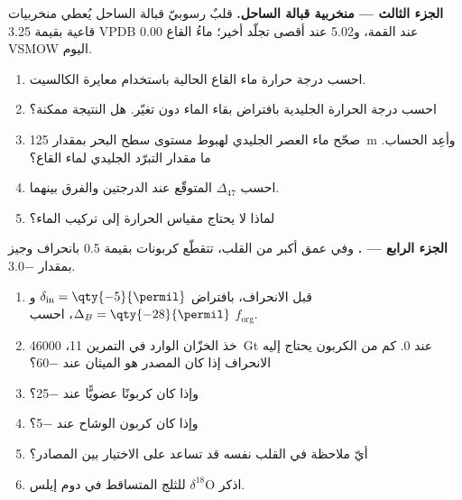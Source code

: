 \begin{problem}
\medskip\noindent\textbf{الجزء الثالث --- منخربية قبالة الساحل.} قلبٌ رسوبيّ قبالة الساحل يُعطي
منخربيات قاعية بقيمة \qty{3.25}{\permil}
VPDB عند القمة، و\qty{5.02}{\permil} عند أقصى تجلّد أخير؛ ماءُ القاع
\qty{0.00}{\permil} VSMOW اليوم.
\begin{enumerate}[resume]
\item احسب درجة حرارة ماء القاع الحالية باستخدام
معايرة الكالسيت.
\item احسب درجة الحرارة الجليدية بافتراض بقاء الماء دون تغيّر. هل
النتيجة ممكنة؟
\item صحّح ماء العصر الجليدي لهبوط مستوى سطح البحر بمقدار \qty{125}{m} وأعِد
الحساب. ما مقدار التبرّد الجليدي لماء القاع؟
\item احسب $\Delta_{47}$ المتوقّع عند الدرجتين
والفرق بينهما.
\item لماذا لا يحتاج مقياس الحرارة  إلى تركيب
الماء؟
\end{enumerate}

\medskip\noindent\textbf{الجزء الرابع --- .} وفي عمق أكبر من القلب،
تتقطّع كربونات بقيمة \qty{+0.5}{\permil} بانحراف وجيز بمقدار
\qty{-3.0}{\permil}.
\begin{enumerate}[resume]
\item قبل الانحراف، بافتراض $\delta_{\mathrm{in}} = \qty{-5}{\permil}$
و$\Delta_B = \qty{-28}{\permil}$، احسب $f_{\mathrm{org}}$.
\item خذ الخزّان الوارد في التمرين 11، \qty{46000}{Gt} عند 0. كم من الكربون
يحتاج إليه الانحراف إذا كان المصدر هو الميثان عند \qty{-60}{\permil}؟
\item وإذا كان كربونًا عضويًّا عند \qty{-25}{\permil}؟
\item وإذا كان كربون الوشاح عند \qty{-5}{\permil}؟
\item أيّ ملاحظة في القلب نفسه قد تساعد على الاختيار بين
المصادر؟
\item اذكر $\delta^{18}\mathrm O$ للثلج المتساقط في دوم إيلس.
\end{enumerate}
\end{problem}
